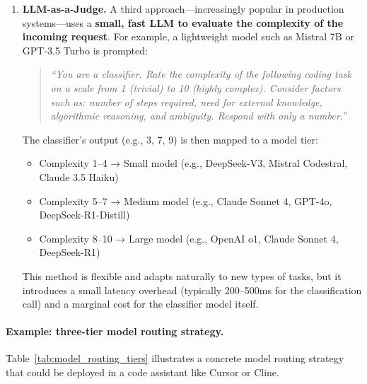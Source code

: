 \documentclass[english]{article}
\begin{document}
\begin{enumerate}
    \item \textbf{LLM-as-a-Judge.} A third approach—increasingly popular in production systems—uses a \textbf{small, fast LLM to evaluate the complexity of the incoming request}. For example, a lightweight model such as Mistral 7B or GPT-3.5 Turbo is prompted:

    \begin{quote}
    \textit{``You are a classifier. Rate the complexity of the following coding task on a scale from 1 (trivial) to 10 (highly complex). Consider factors such as: number of steps required, need for external knowledge, algorithmic reasoning, and ambiguity. Respond with only a number.''}
    \end{quote}

    The classifier's output (e.g., 3, 7, 9) is then mapped to a model tier:
    \begin{itemize}
        \item Complexity 1--4 → Small model (e.g., DeepSeek-V3, Mistral Codestral, Claude 3.5 Haiku)
        \item Complexity 5--7 → Medium model (e.g., Claude Sonnet 4, GPT-4o, DeepSeek-R1-Distill)
        \item Complexity 8--10 → Large model (e.g., OpenAI o1, Claude Sonnet 4, DeepSeek-R1)
    \end{itemize}

    This method is flexible and adapts naturally to new types of tasks, but it introduces a small latency overhead (typically 200--500ms for the classification call) and a marginal cost for the classifier model itself.
\end{enumerate}

\paragraph{Example: three-tier model routing strategy.}

Table~\ref{tab:model_routing_tiers} illustrates a concrete model routing strategy that could be deployed in a code assistant like Cursor or Cline.
\end{document}

